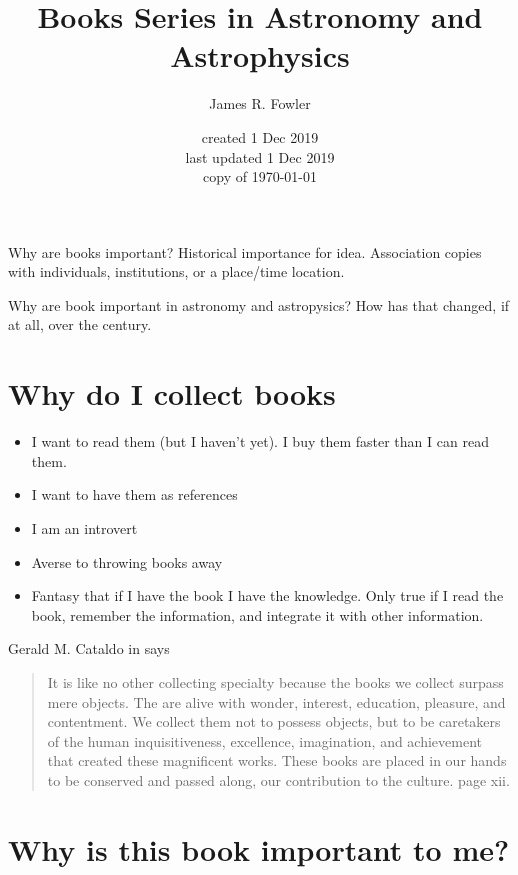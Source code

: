 \documentclass[letterpaper]{article}
\begin{document}
\title{Books Series in Astronomy and Astrophysics}
\author{James R. Fowler}
\date{created 1 Dec 2019\\ last updated 1 Dec 2019\\ copy of \today}

\maketitle

Why are books important? Historical importance for idea. Association
copies with individuals, institutions, or a place/time location.

Why are book important in  astronomy and astropysics? How
has that changed, if at all, over the century.

\section{Why do I collect books}

\begin{itemize}
\item I want to read them (but I haven't yet). I buy them faster than
  I can read them.
\item I want to have them as references
\item I am an introvert
\item Averse to throwing books away
\item Fantasy that if I have the book I have the knowledge. Only true
  if I read the book, remember the information, and integrate it with
  other information.
\end{itemize}

Gerald M. Cataldo in  says
\begin{quotation}
  It is like no other collecting specialty because the books we collect
  surpass mere objects. The are alive with wonder, interest, education,
  pleasure, and contentment. We collect them not to possess objects, but
  to be caretakers of the human inquisitiveness, excellence, imagination,
  and achievement that created these magnificent works. These books are
  placed in our hands to be conserved and passed along, our contribution
  to the culture. \cite{Cataldo2010} page xii.
\end{quotation}

\section{Why is this book important to me?}
\end{document}
